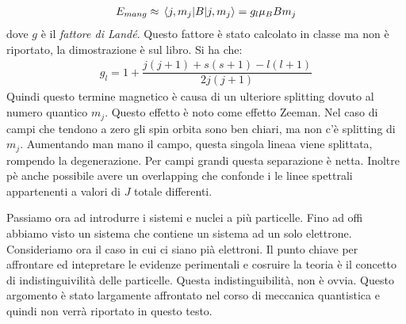 \documentclass[../AppuntiStruttura]{subfiles}
\begin{document}
	\begin{gather}
		E_{mang}\approx\expval{B}{j,m_{j}}=g_{l}\mu_{B}Bm_{j}
	\end{gather}
	dove $ g $ è il \emph{fattore di Landé}. Questo fattore è stato calcolato in classe ma non è riportato, la dimostrazione è sul libro. Si ha che:
	\begin{gather}
	g_{l}=1+\dfrac{j\left(j+1\right)+s\left(s+1\right)-l\left(l+1\right)}{2j\left(j+1\right)}
	\end{gather}
	Quindi questo termine magnetico è causa di un ulteriore splitting dovuto al numero quantico $ m_{j} $. Questo effetto è noto come effetto Zeeman. Nel caso di campi che tendono a zero gli spin orbita sono ben chiari, ma non c'è splitting di $ m_{j} $. Aumentando man mano il campo, questa singola lineaa viene splittata, rompendo la degenerazione. Per campi grandi questa separazione è netta. Inoltre pè anche possibile avere un overlapping che confonde i le linee spettrali appartenenti a valori di $ J $ totale differenti. 
	
	Passiamo ora ad introdurre i sistemi e nuclei a più particelle. Fino ad offi abbiamo visto un sistema che contiene un sistema ad un solo elettrone. Consideriamo ora il caso in cui ci siano pià elettroni. Il punto chiave per affrontare ed intepretare le evidenze perimentali e cosruire la teoria è il concetto di indistinguivilità delle particelle. Questa indistinguibilità, non è ovvia. Questo argomento è stato largamente affrontato nel corso di meccanica quantistica e quindi non verrà riportato in questo testo.
 
\end{document}
